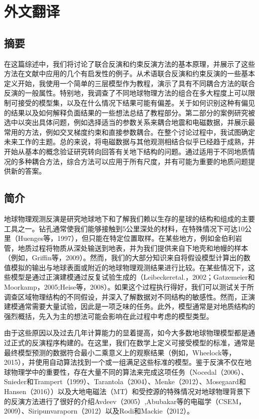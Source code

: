 \cleardoublepage
\newrefsection
\chapter{外文翻译}

\section{摘要}

在这篇综述中，我们将讨论了联合反演和约束反演方法的基本原理，并展示了这些方法在文献中应用的几个有启发性的例子。从术语联合反演和约束反演的一些基本定义开始，我使用一个简单的三层模型作为教程，演示了具有不同耦合方法的联合反演的一般属性。特别地，我调查了不同地球物理方法的组合在多大程度上可以限制可接受的模型集，以及在什么情况下结果可能有偏差。关于如何识别这种有偏见的结果以及如何解释负面结果的一些想法总结了教程部分。第二部分的案例研究被选中以突出具体问题，例如选择适当的参数关系来耦合地震和电磁数据，并展示最常用的方法，例如交叉梯度约束和直接参数耦合。在整个讨论过程中，我试图确定未来工作的主题。总的来说，将电磁数据与其他观测相结合似乎已经趋于成熟，并开始从基本的概念验证研究转向回答有关地下结构的问题。通过适用于不同地质情况的多种耦合方法，综合方法可以应用于所有尺度，并有可能为重要的地质问题提供新的答案。

\section{简介}

地球物理观测反演是研究地球地下和了解我们赖以生存的星球的结构和组成的主要工具之一。钻孔通常使我们能够接触到5公里深处的材料，在特殊情况下可达10公里（Huenges等，1997），但只能在特定位置取样。在某些地方，例如金伯利岩管，地质过程将物质从深处输送到地表，并为我们提供来自下地壳和地幔的样本（例如，Griffin等，2009）。然而，我们的大部分知识来自将假设模型计算出的数值模拟的输出与地球表面或附近的地球物理观测结果进行比较。在某些情况下，这些模型是通过正演建模通过反复试验生成的（Leibeckeretal.，2002；Gatzemeier和 Moorkamp，2005;Heise等，2008）。如果这个过程执行得好，我们可以测试关于所调查区域物理结构的不同假设，并深入了解数据对不同结构的敏感性。然而，正演建模通常需要大量试验，因此是一项乏味的任务。此外，模型通常是对地质结构的强烈概括，先入为主的想法可能会影响在此过程中考虑的模型类型。

由于这些原因以及过去几年计算能力的显着提高，如今大多数地球物理模型都是通过正式的反演程序构建的。在这里，我们在数学上定义可接受模型的标准，通常是最终模型预测的数据符合最小二乘意义上的观察结果（例如，Wheelock等，2015），并使用自动算法找到一个或一组满足这些标准的模型。鉴于反演不仅在地球物理学中的重要性，存在大量不同的算法来完成这项任务（Nocedal（2006）、 Snieder和Trampert（1999）、Tarantola（2004）、Menke（2012）、Mosegaard和Hansen（2016））以及大地电磁法（MT）和受控源的特殊情况对地球物理背景下的反演方法进行了很好的介绍Avdeev（2005）,Abubakar等的电磁学（CSEM，2009）、Siripunvaraporn（2012）以及Rodi和Mackie（2012）。

